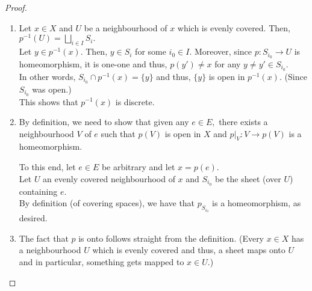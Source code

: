 \documentclass[12pt]{article}
\begin{document}
\begin{proof} 
	\phantom{hi}
	\begin{enumerate}
		\item Let $x \in X$ and $U$ be a neighbourhood of $x$ which is evenly covered. Then, $p^{-1}(U) = \displaystyle\bigsqcup_{i \in I} S_i.$\\
		Let $y \in p^{-1}(x).$ Then, $y \in S_i$ for some $i_0 \in I.$ Moreover, since $p:S_{i_0} \to U$ is homeomorphism, it is one-one and thus, $p(y') \neq x$ for any $y \neq y' \in S_{i_0}.$\\
		In other words, $S_{i_0} \cap p^{-1}(x) = \{y\}$ and thus, $\{y\}$ is open in $p^{-1}(x).$ (Since $S_{i_0}$ was open.)\\
		This shows that $p^{-1}(x)$ is discrete.
		\item By definition, we need to show that given any $e \in E,$ there exists a neighbourhood $V$ of $e$ such that $p(V)$ is open in $X$ and $p|_V:V \to p(V)$ is a homeomorphism.

		To this end, let $e \in E$ be arbitrary and let $x = p(e).$\\
		Let $U$ an evenly covered neighbourhood of $x$ and $S_{i_0}$ be the sheet (over $U$) containing $e.$\\
		By definition (of covering spaces), we have that $p_{S_{i_0}}$ is a homeomorphism, as desired.
		\item The fact that $p$ is onto follows straight from the definition. (Every $x \in X$ has a neighbourhood $U$ which is evenly covered and thus, a sheet maps onto $U$ and in particular, something gets mapped to $x \in U$.)


\end{enumerate}
\end{proof}
\end{document}
